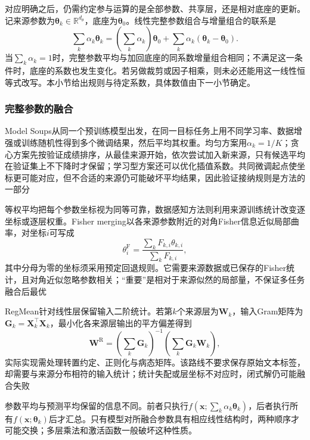 对应明确之后，仍需约定参与运算的是全部参数、共享层，还是相对底座的更新。记来源参数为$\bm{\theta}_k\in\mathbb{R}^{d_\theta}$，底座为$\bm{\theta}_0$。线性完整参数组合与增量组合的联系是
\begin{equation}
  \sum_k\alpha_k\bm{\theta}_k
  =\left(\sum_k\alpha_k\right)\bm{\theta}_0+
    \sum_k\alpha_k(\bm{\theta}_k-\bm{\theta}_0).
  \label{eq:ket-integration-rule-equivalence}
\end{equation}
当$\sum_k\alpha_k=1$时，完整参数平均与加回底座的同系数增量组合相同；不满足这一条件时，底座的系数也发生变化。若另做裁剪或因子相乘，则未必还能用这一线性恒等式改写。本小节给出规则与待定系数，具体数值由下一小节确定。

\subsubsection{完整参数的融合}
\label{sec:ket-integration-full-weights}

Model Soups从同一个预训练模型出发，在同一目标任务上用不同学习率、数据增强或训练随机性得到多个微调结果，然后平均其权重。均匀方案用$\alpha_k=1/K$；贪心方案先按验证成绩排序，从最佳来源开始，依次尝试加入新来源，只有候选平均在验证集上不下降时才保留；学习型方案还可以优化插值系数。共同微调起点使坐标更可能对应，但不合适的来源仍可能破坏平均结果，因此验证接纳规则是方法的一部分

等权平均把每个参数坐标视为同等可靠，数据感知方法则利用来源训练统计改变逐坐标或逐层权重。Fisher merging以各来源参数附近的对角Fisher信息近似局部曲率，对坐标$i$可写成
\[
  \theta_i^{\mathrm{F}}
  =\frac{\sum_k F_{k,i}\theta_{k,i}}
         {\sum_k F_{k,i}},
\]
其中分母为零的坐标须采用预定回退规则。它需要来源数据或已保存的Fisher统计，且对角近似忽略参数相关；“重要”是相对于来源似然的局部量，不保证多任务融合后最优

RegMean针对线性层保留输入二阶统计。若第$k$个来源层为$\bm W_k$，输入Gram矩阵为$\bm G_k=\bm X_k^\top\bm X_k$，最小化各来源层输出的平方偏差得到
\[
  \bm W^{\mathrm{R}}
  =\left(\sum_k\bm G_k\right)^{-1}
    \left(\sum_k\bm G_k\bm W_k\right),
\]
实际实现需处理转置约定、正则化与病态矩阵。该路线不要求保存原始文本标签，却需要与来源分布相符的输入统计；统计失配或层坐标不对应时，闭式解仍可能融合失败

参数平均与预测平均保留的信息不同。前者只执行$f(\bm{x};\sum_k\alpha_k\bm{\theta}_k)$，后者执行所有$f(\bm{x};\bm{\theta}_k)$后才汇总。只有模型对所融合参数具有相应线性结构时，两种顺序才可能交换；多层乘法和激活函数一般破坏这种性质。

